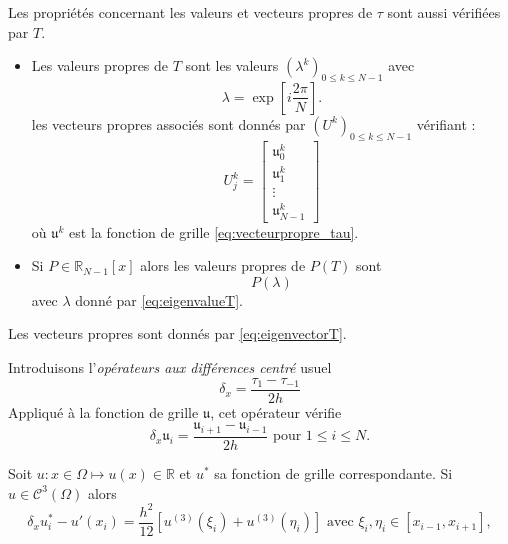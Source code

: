 Les propriétés concernant les valeurs et vecteurs propres de $\tau$ sont aussi vérifiées par $T$.

\begin{proposition}
\begin{itemize}
\item Les valeurs propres de $T$ sont les valeurs $(\lambda^k)_{0 \leq k \leq N-1}$ avec 
\begin{equation}
\lambda = \exp \left[ i \dfrac{2 \pi}{N} \right].
\label{eq:eigenvalueT}
\end{equation}
les vecteurs propres associés sont donnés par $\left( U^k \right)_{0 \leq k \leq N-1}$ vérifiant :
\begin{equation}
U^k_j = \begin{bmatrix}
\mathfrak{u}_0^k\\
\mathfrak{u}_1^k\\
\vdots \\
\mathfrak{u}_{N-1}^k
\end{bmatrix}
\label{eq:eigenvectorT}
\end{equation}
où $\mathfrak{u}^k$ est la fonction de grille \eqref{eq:vecteurpropre_tau}.

\item Si $P \in \mathbb{R}_{N-1}[x]$ alors les valeurs propres de $P(T)$ sont 
\begin{equation}
P(\lambda)
\end{equation}
avec $\lambda$ donné par \eqref{eq:eigenvalueT}.
\end{itemize}
Les vecteurs propres sont donnés par \eqref{eq:eigenvectorT}.
\label{prop:eigen_P(tau)}
\end{proposition}









Introduisons l'\textit{opérateurs aux différences centré} usuel
\begin{equation}
\delta_x = \dfrac{\tau_1 - \tau_{-1}}{2h}
\end{equation}
Appliqué à la fonction de grille $\mathfrak{u}$, cet opérateur vérifie 
\begin{equation}
\delta_x \mathfrak{u}_i = \dfrac{\mathfrak{u}_{i+1} - \mathfrak{u}_{i-1}}{2h} \text{ pour } 1 \leq i \leq N.
\end{equation}

\begin{proposition}
Soit $u: x \in \Omega \mapsto u(x) \in \mathbb{R}$ et $u^*$ sa fonction de grille correspondante. Si $u \in \mathcal{C}^3 (\Omega)$ alors 
\begin{equation}
\delta_x u^*_i - u'(x_i) = \dfrac{h^2}{12} \left[ u^{(3)}(\xi_i) + u^{(3)}(\eta_i) \right]  \text{ avec } \xi_i , \eta_i \in [x_{i-1}, x_{i+1}],
\end{equation}
\end{proposition}

